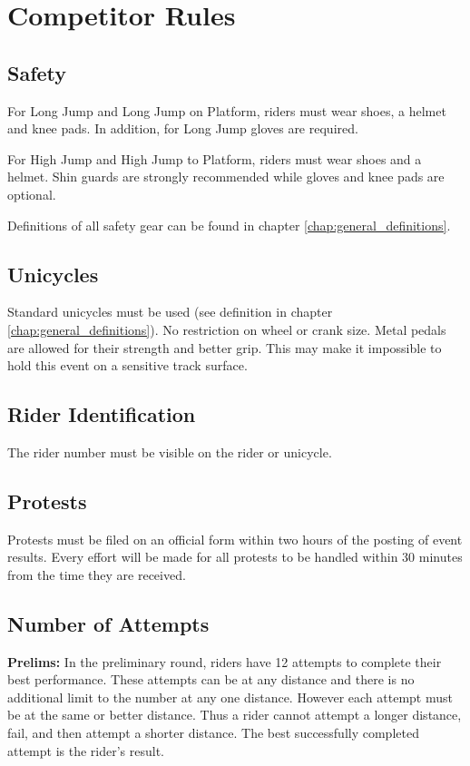\chapter{Competitor Rules}

\section{Safety}

For Long Jump and Long Jump on Platform, riders must wear shoes, a helmet and knee pads.
In addition, for Long Jump gloves are required.

For High Jump and High Jump to Platform, riders must wear shoes and a helmet.
Shin guards are strongly recommended while gloves and knee pads are optional.

Definitions of all safety gear can be found in chapter \ref{chap:general_definitions}.

\section{Unicycles}

Standard unicycles must be used (see definition in chapter \ref{chap:general_definitions}).
No restriction on wheel or crank size.
Metal pedals are allowed for their strength and better grip.
This may make it impossible to hold this event on a sensitive track surface.

\section{Rider Identification}

The rider number must be visible on the rider or unicycle.

\section{Protests}

Protests must be filed on an official form within two hours of the posting of event results. Every effort will be made for all protests to be handled within 30 minutes from the time they are received.

\section{Number of Attempts}

\textbf{Prelims:}
In the preliminary round, riders have 12 attempts to complete their best performance.
These attempts can be at any distance and there is no additional limit to the number at any one distance.
However each attempt must be at the same or better distance.
Thus a rider cannot attempt a longer distance, fail, and then attempt a shorter distance.
The best successfully completed attempt is the rider's result.

